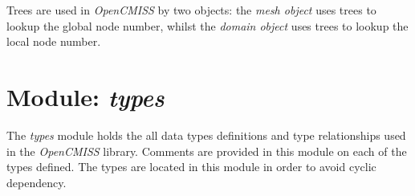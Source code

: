Trees are used in \emph{OpenCMISS} by two objects: the \emph{mesh object} uses 
trees to lookup the global node number, whilst the \emph{domain object} uses
trees to lookup the local node number.


\section{Module: \emph{types}}
\label{sec:types}

The \emph{types} module holds the all data types definitions and type
relationships used in the \emph{OpenCMISS} library. Comments are provided 
in this module on each of the types defined. The types are located in this 
module in order to avoid cyclic dependency. 
